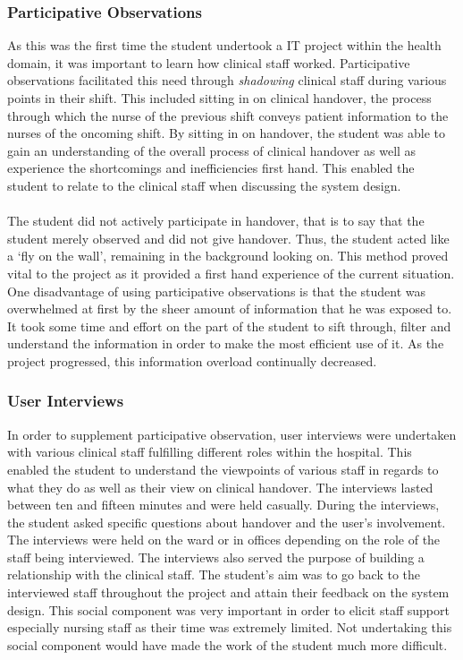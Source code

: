 \subsubsection{Participative Observations}
As this was the first time the student undertook a IT project within the health domain, it was important to learn how clinical staff worked. Participative observations facilitated this need through \emph{shadowing} clinical staff during various points in their shift. This included sitting in on clinical handover, the process through which the nurse of the previous shift conveys patient information to the nurses of the oncoming shift. By sitting in on handover, the student was able to gain an understanding of the overall process of clinical handover as well as experience the shortcomings and inefficiencies first hand. This enabled the student to relate to the clinical staff when discussing the system design. \\ \\
The student did not actively participate in handover, that is to say that the student merely observed and did not give handover. Thus, the student acted like a `fly on the wall', remaining in the background looking on. This method proved vital to the project as it provided a first hand experience of the current situation. One disadvantage of using participative observations is that the student was overwhelmed at first by the sheer amount of information that he was exposed to. It took some time and effort on the part of the student to sift through, filter and understand the information in order to make the most efficient use of it. As the project progressed, this information overload continually decreased.

\subsubsection{User Interviews}
In order to supplement participative observation, user interviews were undertaken with various clinical staff fulfilling different roles within the hospital. This enabled the student to understand the viewpoints of various staff in regards to what they do as well as their view on clinical handover. The interviews lasted between ten and fifteen minutes and were held casually. During the interviews, the student asked specific questions about handover and the user's involvement. The interviews were held on the ward or in offices depending on the role of the staff being interviewed. The interviews also served the purpose of building a relationship with the clinical staff. The student's aim was to go back to the interviewed staff throughout the project and attain their feedback on the system design. This social component was very important in order to elicit staff support especially nursing staff as their time was extremely limited. Not undertaking this social component would have made the work of the student much more difficult.


